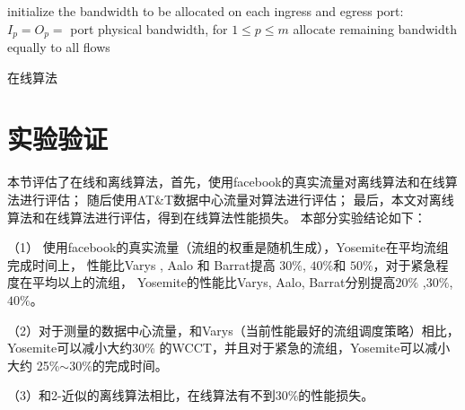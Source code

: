    \begin{algorithm} 
 initialize the bandwidth to be allocated on each ingress and egress port: $I_p=O_p=$ port physical bandwidth, for $1 \le p \le m$\;
allocate remaining bandwidth equally to all flows\;
\caption{在线算法}
   \label{IWCCM-online-algorithm}
 \end{algorithm}
  

 
\section{实验验证}
本节评估了在线和离线算法，首先，使用facebook的真实流量\cite{chowdhury2014efficient}对离线算法和在线算法进行评估；
随后使用AT\&T数据中心流量对算法进行评估；
最后，本文对离线算法和在线算法进行评估，得到在线算法性能损失。
本部分实验结论如下：

（1） 使用facebook\cite{chowdhury2014efficient}的真实流量（流组的权重是随机生成），Yosemite在平均流组完成时间上， 性能比Varys \cite{chowdhury2014efficient}, Aalo \cite{chowdhury2015efficient} 和 Barrat提高  $30\%$, $40\%$和 $50\%$，对于紧急程度在平均以上的流组，
Yosemite的性能比Varys, Aalo, Barrat分别提高$20\%$ ,$ 30\%$,  $40\%$。

（2）对于测量的数据中心流量，和Varys（当前性能最好的流组调度策略）相比，Yosemite可以减小大约30\% 的WCCT，并且对于紧急的流组，Yosemite可以减小大约 25\%$\sim$30\%的完成时间。

（3）和2-近似的离线算法相比，在线算法有不到$30\%$的性能损失。



